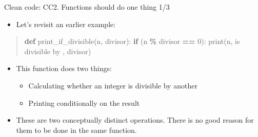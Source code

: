 \documentclass[
  8pt,
  ignorenonframetext,
]{beamer}
\newenvironment{Shaded}{\begin{snugshade}}{\end{snugshade}}
\newcommand{\BuiltInTok}[1]{#1}
\newcommand{\ControlFlowTok}[1]{\textcolor[rgb]{0.13,0.29,0.53}{\textbf{#1}}}
\newcommand{\DecValTok}[1]{\textcolor[rgb]{0.00,0.00,0.81}{#1}}
\newcommand{\KeywordTok}[1]{\textcolor[rgb]{0.13,0.29,0.53}{\textbf{#1}}}
\newcommand{\NormalTok}[1]{#1}
\newcommand{\OperatorTok}[1]{\textcolor[rgb]{0.81,0.36,0.00}{\textbf{#1}}}
\newcommand{\StringTok}[1]{\textcolor[rgb]{0.31,0.60,0.02}{#1}}
\providecommand{\tightlist}{%
  \setlength{\itemsep}{0pt}\setlength{\parskip}{0pt}}
\begin{document}
\begin{frame}[fragile]{Clean code: CC2. Functions should do one thing
1/3}
\protect\hypertarget{clean-code-cc2.-functions-should-do-one-thing-13}{}
\begin{itemize}[<+->]
\tightlist
\item
  Let's revisit an earlier example:
\end{itemize}

\begin{quote}
\begin{Shaded}
\begin{Highlighting}[]
\KeywordTok{def}\NormalTok{ print\_if\_divisible(n, divisor):}
  \ControlFlowTok{if}\NormalTok{ (n }\OperatorTok{\%}\NormalTok{ divisor }\OperatorTok{==} \DecValTok{0}\NormalTok{):}
    \BuiltInTok{print}\NormalTok{(n, }\StringTok{\textquotesingle{} is divisible by \textquotesingle{}}\NormalTok{, divisor)}
\end{Highlighting}
\end{Shaded}
\end{quote}

\begin{itemize}[<+->]
\tightlist
\item
  This function does two things:

  \begin{itemize}[<+->]
  \tightlist
  \item
    Calculating whether an integer is divisible by another
  \item
    Printing conditionally on the result
  \end{itemize}
\end{itemize}

\begin{itemize}[<+->]
\tightlist
\item
  These are two conceptually distinct operations. There is no good
  reason for them to be done in the same function.
\end{itemize}
\end{frame}
\end{document}
